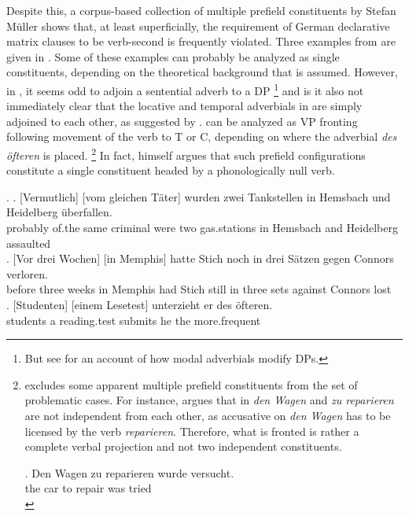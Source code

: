 Despite this, a corpus-based collection of multiple prefield constituents by Stefan Müller \citep{muller2002, muller2003, muller2005} shows that, at least superficially, the requirement of German declarative matrix clauses to be verb-second is frequently violated. Three examples from \citet[32, 38, 59]{muller2003} are given in \Next. Some of these examples can probably be analyzed as single constituents, depending on the theoretical background that is assumed. However, in \Last[a], it seems odd to adjoin a sentential adverb to a DP%
%
\footnote{But see \citet{bogal-allbritten2013} for an account of how modal adverbials modify DPs.}\afterfn%
%
and is it also not immediately clear that the locative and temporal adverbials in \Last[b] are simply adjoined to each other, as suggested by \citet{haider2000}. \Last[c] can be analyzed as VP fronting following movement of the verb to T or C, depending on where the adverbial \textit{des öfteren} is placed.%
%
\footnote{
\citeauthor{muller2003} excludes some apparent multiple prefield constituents from the set of problematic cases. For instance, \citet[21]{muller2003} argues that in \Next \textit{den Wagen} and \textit{zu reparieren} are not independent from each other, as accusative on \textit{den Wagen} has to be licensed by the verb \textit{reparieren}. Therefore, what is fronted is rather a complete verbal projection and not two independent constituents. 

\exg. Den Wagen zu reparieren wurde versucht.\\
      the car to repair was tried\\
       

}\afterfn%
%
In fact, \citet[13--22]{muller2005} himself argues that such prefield configurations constitute a single constituent headed by a phonologically null verb. 

\ex. \ag. [Vermutlich] [vom    gleichen  Täter]    wurden zwei Tankstellen in Hemsbach und Heidelberg überfallen.\\
probably of.the  same criminal were two gas.stations in Hemsbach and Heidelberg assaulted\\
\bg. [Vor drei  Wochen] [in Memphis] hatte Stich noch in drei Sätzen gegen Connors verloren.\\ 
before three weeks    in Memphis  had   Stich  still   in three sets   against Connors lost\\
\cg. [Studenten] [einem Lesetest] unterzieht er des öfteren.\label{ex:muller-vf-doio} \\ 
students a reading.test  submits he the more.frequent\\

